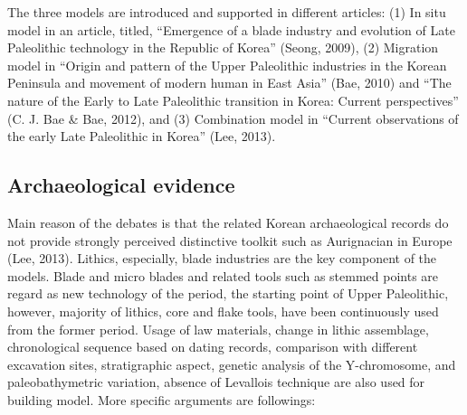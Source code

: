 \documentclass[american,man]{apa6}
\begin{document}
The three models are introduced and supported in different articles: (1)
In situ model in an article, titled, \enquote{Emergence of a blade
industry and evolution of Late Paleolithic technology in the Republic of
Korea} (Seong, 2009), (2) Migration model in \enquote{Origin and pattern
of the Upper Paleolithic industries in the Korean Peninsula and movement
of modern human in East Asia} (Bae, 2010) and \enquote{The nature of the
Early to Late Paleolithic transition in Korea: Current perspectives} (C.
J. Bae \& Bae, 2012), and (3) Combination model in \enquote{Current
observations of the early Late Paleolithic in Korea} (Lee, 2013).

\subsection{Archaeological evidence}\label{archaeological-evidence}

Main reason of the debates is that the related Korean archaeological
records do not provide strongly perceived distinctive toolkit such as
Aurignacian in Europe (Lee, 2013). Lithics, especially, blade industries
are the key component of the models. Blade and micro blades and related
tools such as stemmed points are regard as new technology of the period,
the starting point of Upper Paleolithic, however, majority of lithics,
core and flake tools, have been continuously used from the former
period. Usage of law materials, change in lithic assemblage,
chronological sequence based on dating records, comparison with
different excavation sites, stratigraphic aspect, genetic analysis of
the Y-chromosome, and paleobathymetric variation, absence of Levallois
technique are also used for building model. More specific arguments are
followings:
\end{document}
